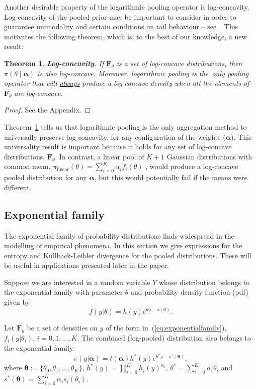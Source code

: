 \documentclass[a4paper, notitlepage, 11pt]{article}
\newtheorem{theo}{Theorem}[]
\begin{document}
Another desirable property of the logarithmic pooling operator is log-concavity.
Log-concavity of the pooled prior may be important to consider in order to guarantee unimodality and certain conditions on tail behaviour -- see~\cite{Bagnoli2005}.
This motivates the following theorem, which is, to the best of our knowledge, a new result:
\begin{theo}
\label{thm:concavity}
\textbf{Log-concavity}. 
If $\mathbf{F}_{\theta}$ is a set of log-concave distributions, then $\pi(\theta\mid \boldsymbol \alpha)$ is also log-concave.
Moreover, logarithmic pooling is the~\underline{only} pooling operator that will \underline{always} produce a log-concave density when all the elements of $\mathbf{F}_{\theta}$  are log-concave.
\end{theo}
\begin{proof}
 See the Appendix.
\end{proof} 
Theorem~\ref{thm:concavity} tells us that logarithmic pooling is the only aggregation method to universally preserve log-concavity, for any configuration of the weights ($\boldsymbol{\alpha}$).
This universality result is important because it holds for any set of log-concave distributions, $\mathbf{F}_{\theta}$.
In contrast, a linear pool of $K + 1$ Gaussian distributions with common mean, $\pi_{\text{linear}}(\theta) = \sum_{i=0}^K \alpha_i f_i(\theta)$ , would produce a log-concave pooled distribution for any $\boldsymbol{\alpha}$, but this would potentially fail if the means were different.

\subsection{Exponential family}
\label{sec:expofamily}

The exponential family of probability distributions finds widespread in the modelling of empirical phenomena.
In this section we give expressions for the entropy and Kullback-Leibler divergence for the pooled distributions. 
These will be useful in applications presented later in the paper.

Suppose we are interested in a random variable $Y$ whose distribution belongs to the exponential family with parameter $\theta$ and probability density function (pdf) given by
\begin{equation}
\label{eq:exponentialfamily}
f(y|\theta) = h(y) e^{\theta y - s(\theta)}.
\end{equation}

Let $\mathbf{F}_{y}$ be a set of densities on $y$ of the form in~(\ref{eq:exponentialfamily}), $f_i(y|\theta_i)$, $ i = 0, 1, \ldots, K$. 
The combined (log-pooled) distribution also belongs to the exponential family:
\begin{equation}
\label{eq:pooldistEF}
\pi(y| \boldsymbol\alpha ) = t(\boldsymbol\alpha) h^\ast (y) e^{\theta^\ast y - s^\ast (\boldsymbol\theta)},
\end{equation}
where $\boldsymbol\theta :=\{\theta_0, \theta_1, \ldots, \theta_K \}$, $h^\ast (y) = \prod_{i = 0}^K h_i(y)^{\alpha_i}$,  $\theta^\ast = \sum_{i = 0}^K \alpha_i \theta_i$ and $s^\ast (\boldsymbol\theta) = \sum_{i = 0}^K \alpha_i s_i(\theta_i)$.
\end{document}
